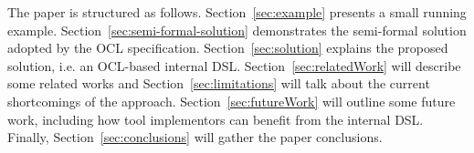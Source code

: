 \documentclass{llncs}
\begin{document}


The paper is structured as follows. Section~\ref{sec:example} presents a small running example. Section~\ref{sec:semi-formal-solution} demonstrates the semi-formal solution adopted by the OCL specification. Section~\ref{sec:solution} explains the proposed solution, i.e. an OCL-based internal DSL. Section~\ref{sec:relatedWork} will describe some related works and Section~\ref{sec:limitations} will talk about the current shortcomings of the approach. Section~\ref{sec:futureWork} will outline some future work, including how tool implementors can benefit from the internal DSL. Finally, Section~\ref{sec:conclusions} will gather the paper conclusions.



\end{document}
